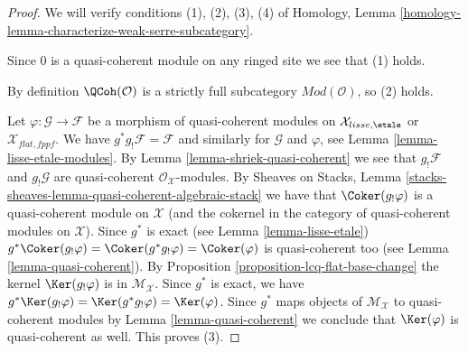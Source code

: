 \begin{proof}
We will verify conditions (1), (2), (3), (4) of
Homology, Lemma \ref{homology-lemma-characterize-weak-serre-subcategory}.

\medskip\noindent
Since $0$ is a quasi-coherent module on any ringed site we see that (1)
holds.

\medskip\noindent
By definition $\QCoh(\mathcal{O})$
is a strictly full subcategory $\textit{Mod}(\mathcal{O})$, so (2) holds.

\medskip\noindent
Let $\varphi : \mathcal{G} \to \mathcal{F}$ be a morphism of quasi-coherent
modules on $\mathcal{X}_{lisse,\etale}$ or $\mathcal{X}_{flat,fppf}$.
We have $g^*g_!\mathcal{F} = \mathcal{F}$ and similarly for
$\mathcal{G}$ and $\varphi$, see Lemma \ref{lemma-lisse-etale-modules}.
By Lemma \ref{lemma-shriek-quasi-coherent}
we see that $g_!\mathcal{F}$ and $g_!\mathcal{G}$ are quasi-coherent
$\mathcal{O}_\mathcal{X}$-modules. By Sheaves on Stacks, Lemma
\ref{stacks-sheaves-lemma-quasi-coherent-algebraic-stack}
we have that $\Coker(g_!\varphi)$ is a quasi-coherent
module on $\mathcal{X}$ (and the cokernel in the category
of quasi-coherent modules on $\mathcal{X}$).
Since $g^*$ is exact (see Lemma \ref{lemma-lisse-etale})
$g^*\Coker(g_!\varphi) = \Coker(g^*g_!\varphi) = \Coker(\varphi)$
is quasi-coherent too (see Lemma \ref{lemma-quasi-coherent}).
By Proposition \ref{proposition-lcq-flat-base-change}
the kernel $\Ker(g_!\varphi)$ is in $\mathcal{M}_\mathcal{X}$.
Since $g^*$ is exact, we have
$g^*\Ker(g_!\varphi) = \Ker(g^*g_!\varphi) = \Ker(\varphi)$.
Since $g^*$ maps objects of $\mathcal{M}_\mathcal{X}$ to quasi-coherent
modules by Lemma \ref{lemma-quasi-coherent} we conclude that
$\Ker(\varphi)$ is quasi-coherent as well. This proves (3).


\end{proof}
